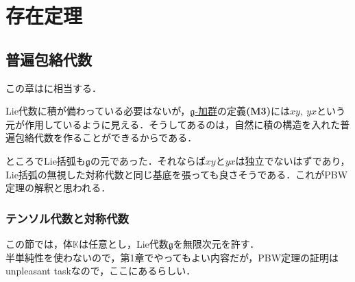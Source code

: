 \documentclass[rep_main]{subfiles}
\begin{document}
\setcounter{chapter}{4}
\chapter{存在定理}
\section{普遍包絡代数}

この章は\cite[Chapter V]{Humphreys1972introduction}に相当する．

Lie代数に積が備わっている必要はないが，\hyperref[ax:g-module]{$\mathfrak{g}$-加群}の定義\textbf{(M3)}には$xy,\ yx$という元が作用しているように見える．そうしてあるのは，自然に積の構造を入れた普遍包絡代数を作ることができるからである．

ところでLie括弧も$\mathfrak{g}$の元であった．それならば$xy$と$yx$は独立でないはずであり，Lie括弧の無視した対称代数と同じ基底を張っても良さそうである．これがPBW定理の解釈と思われる．

\subsection{テンソル代数と対称代数}
この節では，体$\mathbb{K}$は任意とし，Lie代数$\mathfrak{g}$を無限次元を許す．\\
半単純性を使わないので，第1章でやってもよい内容だが，PBW定理の証明はunpleasant taskなので，ここにあるらしい．
\end{document}
